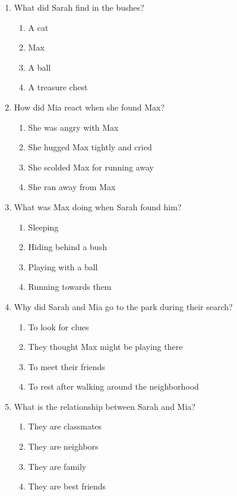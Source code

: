 \documentclass[12pt]{article}
\begin{document}
\begin{enumerate}
    \item What did Sarah find in the bushes?
    \begin{enumerate}[label=\Alph*.]
        \item A cat
        \item Max
        \item A ball
        \item A treasure chest
    \end{enumerate}
    \vspace{0.5cm}

    \item How did Mia react when she found Max?
    \begin{enumerate}[label=\Alph*.]
        \item She was angry with Max
        \item She hugged Max tightly and cried
        \item She scolded Max for running away
        \item She ran away from Max
    \end{enumerate}
    \vspace{0.5cm}

    \item What was Max doing when Sarah found him?
    \begin{enumerate}[label=\Alph*.]
        \item Sleeping
        \item Hiding behind a bush
        \item Playing with a ball
        \item Running towards them
    \end{enumerate}
    \vspace{0.5cm}

\vspace{0.5cm}
    \item Why did Sarah and Mia go to the park during their search?
    \begin{enumerate}[label=\Alph*.]
        \item To look for clues
        \item They thought Max might be playing there
        \item To meet their friends
        \item To rest after walking around the neighborhood
    \end{enumerate}
    \vspace{0.5cm}

    \item What is the relationship between Sarah and Mia?
    \begin{enumerate}[label=\Alph*.]
        \item They are classmates
        \item They are neighbors
        \item They are family
        \item They are best friends
    \end{enumerate}
    \vspace{0.5cm}


\end{enumerate}
\end{document}
